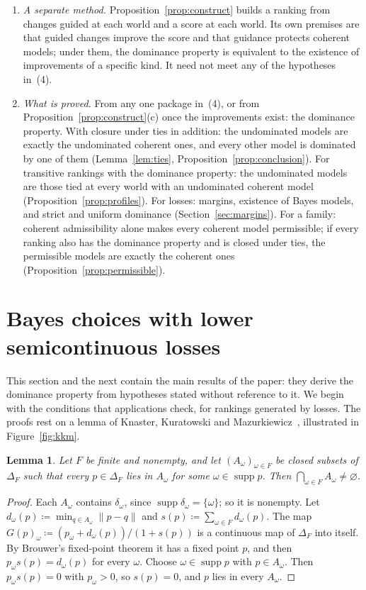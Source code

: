 \documentclass[11pt]{article}
\newtheorem{lemma}[theorem]{Lemma}
\theoremstyle{definition}
\theoremstyle{remark}
\newcommand{\supp}{\operatorname{supp}}
\begin{document}
\begin{enumerate}[label=(\arabic*),leftmargin=*]
\item \emph{A separate method.} Proposition~\ref{prop:construct} builds a ranking from changes guided at each world and a score at each world. Its own premises are that guided changes improve the score and that guidance protects coherent models; under them, the dominance property is equivalent to the existence of improvements of a specific kind. It need not meet any of the hypotheses in~(4).
\item \emph{What is proved.} From any one package in~(4), or from Proposition~\ref{prop:construct}(c) once the improvements exist: the dominance property. With closure under ties in addition: the undominated models are exactly the undominated coherent ones, and every other model is dominated by one of them (Lemma~\ref{lem:ties}, Proposition~\ref{prop:conclusion}). For transitive rankings with the dominance property: the undominated models are those tied at every world with an undominated coherent model (Proposition~\ref{prop:profiles}). For losses: margins, existence of Bayes models, and strict and uniform dominance (Section~\ref{sec:margins}). For a family: coherent admissibility alone makes every coherent model permissible; if every ranking also has the dominance property and is closed under ties, the permissible models are exactly the coherent ones (Proposition~\ref{prop:permissible}).
\end{enumerate}

\section{Bayes choices with lower semicontinuous losses}\label{sec:bayes}

This section and the next contain the main results of the paper: they derive the dominance property from hypotheses stated without reference to it. We begin with the conditions that applications check, for rankings generated by losses. The proofs rest on a lemma of Knaster, Kuratowski and Mazurkiewicz~\cite{KKM}, illustrated in Figure~\ref{fig:kkm}.

\begin{lemma}\label{lem:kkm}
Let $F$ be finite and nonempty, and let $(A_\omega)_{\omega\in F}$ be closed subsets of $\Delta_F$ such that every $p\in\Delta_F$ lies in $A_\omega$ for some $\omega\in\supp p$. Then $\bigcap_{\omega\in F}A_\omega\ne\varnothing$.
\end{lemma}
\begin{proof}
Each $A_\omega$ contains $\delta_\omega$, since $\supp\delta_\omega=\{\omega\}$; so it is nonempty. Let $d_\omega(p)\coloneqq\min_{q\in A_\omega}\lVert p-q\rVert$ and $s(p)\coloneqq\sum_{\omega\in F}d_\omega(p)$. The map $G(p)_\omega\coloneqq(p_\omega+d_\omega(p))/(1+s(p))$ is a continuous map of $\Delta_F$ into itself. By Brouwer's fixed-point theorem it has a fixed point $p$, and then $p_\omega s(p)=d_\omega(p)$ for every $\omega$. Choose $\omega\in\supp p$ with $p\in A_\omega$. Then $p_\omega s(p)=0$ with $p_\omega>0$, so $s(p)=0$, and $p$ lies in every $A_\omega$.
\end{proof}
\end{document}
